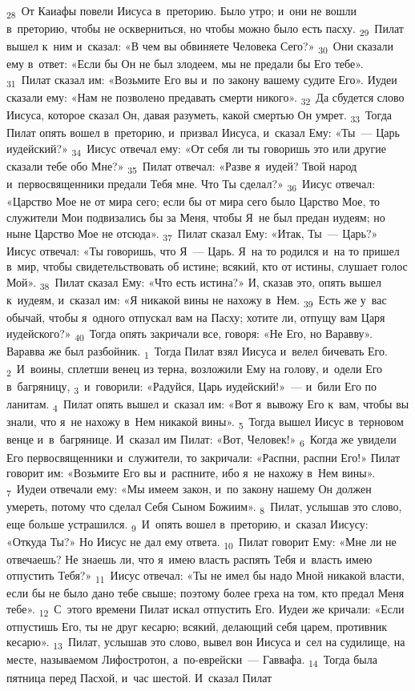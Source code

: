 \documentclass[a4paper,12pt]{article}
\begin{document}
\textsubscript{28}~От Каиафы повели Иисуса в~преторию. Было утро; и~они не вошли в~преторию, чтобы не оскверниться, но чтобы можно было есть пасху. \textsubscript{29}~Пилат вышел к~ним и~сказал: «В чем вы обвиняете Человека Сего?» \textsubscript{30}~Они сказали ему в~ответ: «Если бы Он не был злодеем, мы не предали бы Его тебе». \textsubscript{31}~Пилат сказал им: «Возьмите Его вы и~по закону вашему судите Его». Иудеи сказали ему: «Нам не позволено предавать смерти никого». \textsubscript{32}~Да сбудется слово Иисуса, которое сказал Он, давая разуметь, какой смертью Он умрет. \textsubscript{33}~Тогда Пилат опять вошел в~преторию, и~призвал Иисуса, и~сказал Ему: «Ты~--- Царь иудейский?» \textsubscript{34}~Иисус отвечал ему: «От себя ли ты говоришь это или другие сказали тебе обо Мне?» \textsubscript{35}~Пилат отвечал: «Разве я~иудей? Твой народ и~первосвященники предали Тебя мне. Что Ты сделал?» \textsubscript{36}~Иисус отвечал: «Царство Мое не от мира сего; если бы от мира сего было Царство Мое, то служители Мои подвизались бы за Меня, чтобы Я~не был предан иудеям; но ныне Царство Мое не отсюда». \textsubscript{37}~Пилат сказал Ему: «Итак, Ты~--- Царь?» Иисус отвечал: «Ты говоришь, что Я~— Царь. Я~на то родился и~на то пришел в~мир, чтобы свидетельствовать об истине; всякий, кто от истины, слушает голос Мой». \textsubscript{38}~Пилат сказал Ему: «Что есть истина?» И, сказав это, опять вышел к~иудеям, и~сказал им: «Я никакой вины не нахожу в~Нем. \textsubscript{39}~Есть же у~вас обычай, чтобы я~одного отпускал вам на Пасху; хотите ли, отпущу вам Царя иудейского?» \textsubscript{40}~Тогда опять закричали все, говоря: «Не Его, но Варавву». Варавва же был разбойник. \textsubscript{1}~Тогда Пилат взял Иисуса и~велел бичевать Его. \textsubscript{2}~И~воины, сплетши венец из терна, возложили Ему на голову, и~одели Его в~багряницу, \textsubscript{3}~и~говорили: «Радуйся, Царь иудейский!»~--- и~били Его по ланитам. \textsubscript{4}~Пилат опять вышел и~сказал им: «Вот я~вывожу Его к~вам, чтобы вы знали, что я~не нахожу в~Нем никакой вины». \textsubscript{5}~Тогда вышел Иисус в~терновом венце и~в~багрянице. И~сказал им Пилат: «Вот, Человек!» \textsubscript{6}~Когда же увидели Его первосвященники и~служители, то закричали: «Распни, распни Его!» Пилат говорит им: «Возьмите Его вы и~распните, ибо я~не нахожу в~Нем вины». \textsubscript{7}~Иудеи отвечали ему: «Мы имеем закон, и~по закону нашему Он должен умереть, потому что сделал Себя Сыном Божиим». \textsubscript{8}~Пилат, услышав это слово, еще больше устрашился. \textsubscript{9}~И~опять вошел в~преторию, и~сказал Иисусу: «Откуда Ты?» Но Иисус не дал ему ответа. \textsubscript{10}~Пилат говорит Ему: «Мне ли не отвечаешь? Не знаешь ли, что я~имею власть распять Тебя и~власть имею отпустить Тебя?» \textsubscript{11}~Иисус отвечал: «Ты не имел бы надо Мной никакой власти, если бы не было дано тебе свыше; поэтому более греха на том, кто предал Меня тебе». \textsubscript{12}~С~этого времени Пилат искал отпустить Его. Иудеи же кричали: «Если отпустишь Его, ты не друг кесарю; всякий, делающий себя царем, противник кесарю». \textsubscript{13}~Пилат, услышав это слово, вывел вон Иисуса и~сел на судилище, на месте, называемом Лифостротон, а~по-еврейски~--- Гаввафа. \textsubscript{14}~Тогда была пятница перед Пасхой, и~час шестой. И~сказал Пилат 
\end{document}
